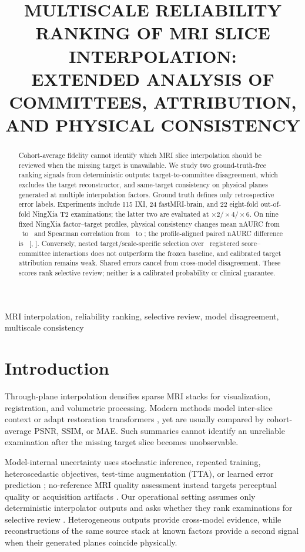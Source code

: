 \documentclass{article}
\title{MULTISCALE RELIABILITY RANKING OF MRI SLICE INTERPOLATION:\\
EXTENDED ANALYSIS OF COMMITTEES, ATTRIBUTION, AND PHYSICAL CONSISTENCY}
\begin{document}
\ninept
\maketitle

\begin{abstract}
Cohort-average fidelity cannot identify which MRI slice interpolation should be reviewed when the missing target is unavailable. We study two ground-truth-free ranking signals from deterministic outputs: target-to-committee disagreement, which excludes the target reconstructor, and same-target consistency on physical planes generated at multiple interpolation factors. Ground truth defines only retrospective error labels. Experiments include 115 IXI, 24 fastMRI-brain, and 22 eight-fold out-of-fold NingXia T2 examinations; the latter two are evaluated at $\times2/\times4/\times6$. On nine fixed NingXia factor--target profiles, physical consistency changes mean nAURC from \NestedBaselineNAURC\ to \NestedTriageNAURC\ and Spearman correlation from \NestedBaselineRho\ to \NestedTriageRho; the profile-aligned paired nAURC difference is \NestedDeltaNAURC\ [\NestedDeltaNAURCLo, \NestedDeltaNAURCHi]. Conversely, nested target/scale-specific selection over \NestedInteractionCount\ registered score--committee interactions does not outperform the frozen baseline, and calibrated target attribution remains weak. Shared errors cancel from cross-model disagreement. These scores rank selective review; neither is a calibrated probability or clinical guarantee.
\end{abstract}

\begin{keywords}
MRI interpolation, reliability ranking, selective review, model disagreement, multiscale consistency
\end{keywords}

\section{Introduction}
Through-plane interpolation densifies sparse MRI stacks for visualization, registration, and volumetric processing. Modern methods model inter-slice context or adapt restoration transformers \cite{song2024i3net,liang2021swinir,chen2022hat}, yet are usually compared by cohort-average PSNR, SSIM, or MAE. Such summaries cannot identify an unreliable examination after the missing target slice becomes unobservable.

Model-internal uncertainty uses stochastic inference, repeated training, heteroscedastic objectives, test-time augmentation (TTA), or learned error prediction \cite{gal2016dropout,lakshminarayanan2017deepensembles,kendall2017uncertainties,wang2018tta,edupuganti2021uqmri,hu2021predict,zhang2024trainingfree}; no-reference MRI quality assessment instead targets perceptual quality or acquisition artifacts \cite{stepien2022nriqa}. Our operational setting assumes only deterministic interpolator outputs and asks whether they rank examinations for selective review \cite{elyaniv2010selective,geifman2019selectivenet,ding2020aurc}. Heterogeneous outputs provide cross-model evidence, while reconstructions of the same source stack at known factors provide a second signal when their generated planes coincide physically.
\end{document}
